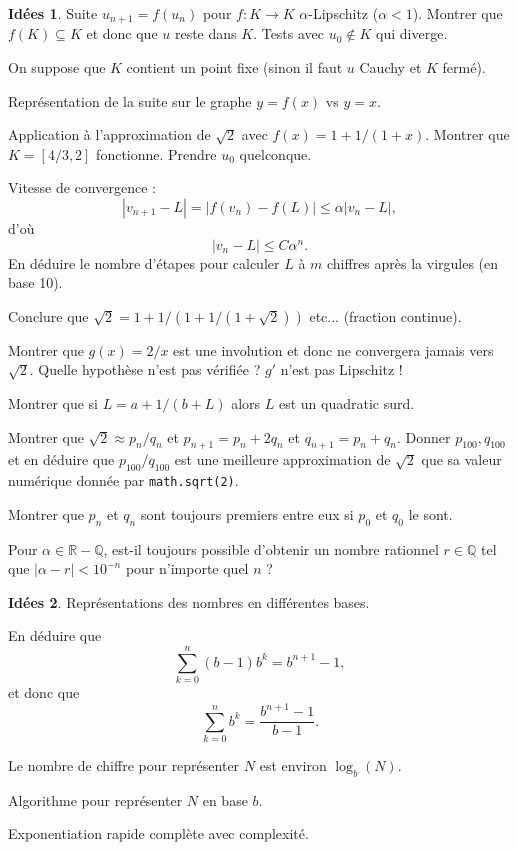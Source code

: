 \documentclass[a4paper,12pt, notitlepage]{article}
\theoremstyle{definition}
\newtheorem{idee}{Idées}
\newcommand{\Q}{\mathbb{Q}}
\newcommand{\R}{\mathbb{R}}
\begin{document}
\begin{idee}
	Suite $u_{n+1} = f(u_n)$ pour $f : K \rightarrow K$ $\alpha$-Lipschitz ($\alpha < 1$).
	Montrer que $f(K) \subseteq K$ et donc que $u$ reste dans $K$.
	Tests avec $u_0 \not\in K$ qui diverge.
	
	On suppose que $K$ contient un point fixe (sinon il faut $u$ Cauchy et $K$ fermé).
	
	Représentation de la suite sur le graphe $y=f(x)$ vs $y=x$.
	
	Application à l'approximation de $\sqrt{2}$ avec $f(x) =1 + 1/(1+x)$.
	Montrer que $K=[4/3,2]$ fonctionne. Prendre $u_0$ quelconque.
	
	Vitesse de convergence :
		\[ |v_{n+1} - L| = |f(v_n) - f(L)| \leq \alpha |v_n - L|, \]
	d'où
		\[ |v_n - L| \leq C \alpha^n. \]
	En déduire le nombre d'étapes pour calculer $L$ à $m$ chiffres après la virgules (en base 10).
	
	Conclure que $\sqrt{2} = 1 + 1/(1+1/(1+\sqrt{2}))$ etc... (fraction continue).
	
	Montrer que $g(x) = 2/x$ est une involution et donc ne convergera jamais vers $\sqrt{2}$. 
	Quelle hypothèse n'est pas vérifiée ? $g'$ n'est pas Lipschitz !
	
	Montrer que si $L = a + 1/(b+L)$ alors $L$ est un quadratic surd.
	
	Montrer que $\sqrt2 \approx p_n/q_n$ et $p_{n+1} = p_n + 2q_n$ et $q_{n+1} = p_n + q_n$.
	Donner $p_{100}, q_{100}$ et en déduire que $p_{100}/q_{100}$ est une meilleure approximation de $\sqrt2$ que sa valeur numérique donnée par \texttt{math.sqrt(2)}.
	
	Montrer que $p_n$ et $q_n$ sont toujours premiers entre eux si $p_0$ et $q_0$ le sont.
	
	Pour $\alpha\in\R-\Q$, est-il toujours possible d'obtenir un nombre rationnel $r\in\Q$ tel que $|\alpha - r| < 10^{-n}$ pour n'importe quel $n$ ?
\end{idee}

\begin{idee}
	Représentations des nombres en différentes bases.
	
	En déduire que 
		\[ \sum_{k=0}^{n} (b-1)b^k = b^{n+1} - 1, \]
	et donc que 
		\[ \sum_{k=0}^n b^k = \dfrac{b^{n+1} - 1}{b-1}. \]
	
	Le nombre de chiffre pour représenter $N$ est environ $\log_b(N)$. 
	
	Algorithme pour représenter $N$ en base $b$.
	
	Exponentiation rapide complète avec complexité.
\end{idee}
\end{document}
